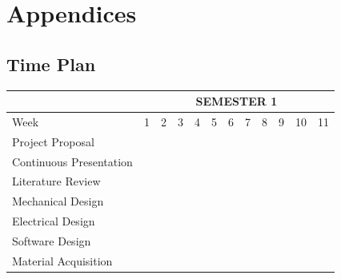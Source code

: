 \chapter{Appendices}

\section{Time Plan}

\begin{table}[H]
  \begin{center}
    \leavevmode
{}
\begin{tabular}{|l|c|c|c|c|c|c|c|c|c|c|c|} \hline
& \multicolumn{11}{c|}{SEMESTER 1} \\ \hline
\rowcolor{white} Week & 1 & 2 & 3 & 4 & 5 & 6 & 7 & 8 & 9 & 10 & 11 \\ \hline
\rowcolor{white} Project Proposal & & \cellcolor{black} & \cellcolor{black} & \cellcolor{black} & & & & & & & \\ \hline
\rowcolor{white} Continuous Presentation & & & & & \cellcolor{black} & \cellcolor{black} & \cellcolor{black} & \cellcolor{black} & \cellcolor{black} & \cellcolor{black} & \cellcolor{black} \\ \hline
\rowcolor{white} Literature Review & & & & & & \cellcolor{black} & \cellcolor{black} & \cellcolor{black} & \cellcolor{black} & \cellcolor{black} & \cellcolor{black} \\ \hline
\rowcolor{white} Mechanical Design & & & & & & & \cellcolor{black} & \cellcolor{black} & \cellcolor{black} & \cellcolor{black} & \\ \hline
\rowcolor{white} Electrical Design & & & & & & & \cellcolor{black} & \cellcolor{black} & \cellcolor{black} & \cellcolor{black} & \\ \hline
\rowcolor{white} Software Design & & & & & & & & & \cellcolor{black} & \cellcolor{black} & \cellcolor{black} \\ \hline
\rowcolor{white} Material Acquisition & & & & & & & & & & & \cellcolor{black} \\ \hline
\end{tabular}
\label{table:semester1timeplan}
\end{center}
\end{table}

